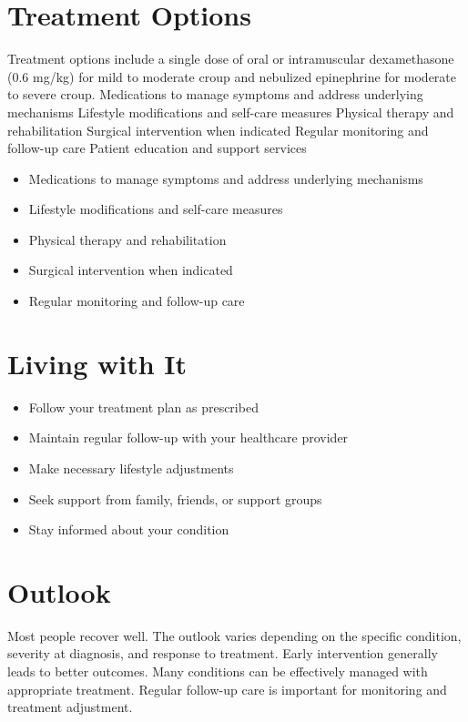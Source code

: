 \section{Treatment Options}
Treatment options include a single dose of oral or intramuscular dexamethasone (0.6 mg/kg) for mild to moderate croup and nebulized epinephrine for moderate to severe croup. Medications to manage symptoms and address underlying mechanisms Lifestyle modifications and self-care measures Physical therapy and rehabilitation Surgical intervention when indicated Regular monitoring and follow-up care Patient education and support services

\begin{itemize}[noitemsep]
  \item Medications to manage symptoms and address underlying mechanisms
  \item Lifestyle modifications and self-care measures
  \item Physical therapy and rehabilitation
  \item Surgical intervention when indicated
  \item Regular monitoring and follow-up care
\end{itemize}
\section{Living with It}
\begin{itemize}[noitemsep]
  \item Follow your treatment plan as prescribed
  \item Maintain regular follow-up with your healthcare provider
  \item Make necessary lifestyle adjustments
  \item Seek support from family, friends, or support groups
  \item Stay informed about your condition
\end{itemize}
\section{Outlook}
Most people recover well. The outlook varies depending on the specific condition, severity at diagnosis, and response to treatment. Early intervention generally leads to better outcomes. Many conditions can be effectively managed with appropriate treatment. Regular follow-up care is important for monitoring and treatment adjustment.
